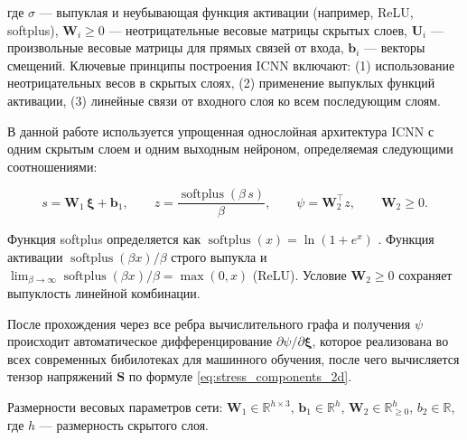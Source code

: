 где $\sigma$ — выпуклая и неубывающая функция активации (например, ReLU, softplus), $\mathbf{W}_i \geq 0$ — неотрицательные весовые матрицы скрытых слоев, $\mathbf{U}_i$ — произвольные весовые матрицы для прямых связей от входа, $\mathbf{b}_i$ — векторы смещений. Ключевые принципы построения ICNN включают: (1) использование неотрицательных весов в скрытых слоях, (2) применение выпуклых функций активации, (3) линейные связи от входного слоя ко всем последующим слоям.

В данной работе используется упрощенная однослойная архитектура ICNN с одним скрытым слоем и одним выходным нейроном, 
определяемая следующими соотношениями:

\begin{equation}
  s = \mathbf{W}_1 \,\boldsymbol{\xi} + \mathbf{b}_1,\qquad
  z=\frac{\operatorname{softplus}(\beta\, s)}{\beta},\qquad
  \psi = \mathbf{W}_2^{\top} z,\qquad \mathbf{W}_2 \ge 0.
  \label{eq:icnn_architecture}
\end{equation}

Функция softplus определяется как $\operatorname{softplus}(x) = \ln(1 + e^x)$ \cite{dugas2001incorporating}. 
Функция активации $\operatorname{softplus}(\beta x)/\beta$ строго выпукла и
$\lim_{\beta\to\infty}\operatorname{softplus}(\beta x)/\beta=\max(0,x)$ (ReLU).
Условие $\mathbf{W}_2\ge 0$ сохраняет выпуклость линейной комбинации. 

После прохождения через все ребра вычислительного графа 
и получения $\psi$ происходит автоматическое дифференцирование $\partial\psi/\partial\boldsymbol{\xi}$, 
которое реализована во всех современных бибилотеках для машинного обучения,
после чего вычисляется тензор напряжений $\mathbf{S}$ по формуле \eqref{eq:stress_components_2d}.

Размерности весовых параметров сети: $\mathbf{W}_1 \in \mathbb{R}^{h \times 3}$, $\mathbf{b}_1 \in \mathbb{R}^{h}$,
 $\mathbf{W}_2 \in \mathbb{R}^{h}_{\geq 0}$, $b_2 \in \mathbb{R}$, где $h$ — размерность скрытого слоя.





